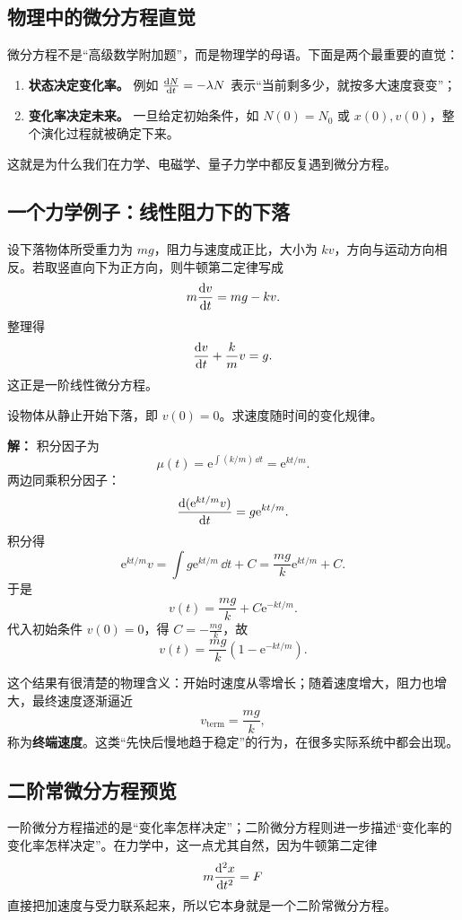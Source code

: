 \subsection{物理中的微分方程直觉}

微分方程不是“高级数学附加题”，而是物理学的母语。下面是两个最重要的直觉：
\begin{enumerate}
  \item \textbf{状态决定变化率。} 例如 $\dv{N}{t}=-\lambda N$ 表示“当前剩多少，就按多大速度衰变”；
  \item \textbf{变化率决定未来。} 一旦给定初始条件，如 $N(0)=N_0$ 或 $x(0),v(0)$，整个演化过程就被确定下来。
\end{enumerate}
这就是为什么我们在力学、电磁学、量子力学中都反复遇到微分方程。

\subsection{一个力学例子：线性阻力下的下落}

设下落物体所受重力为 $mg$，阻力与速度成正比，大小为 $kv$，方向与运动方向相反。若取竖直向下为正方向，则牛顿第二定律写成
\[
  m\dv{v}{t}=mg-kv.
\]
整理得
\[
  \dv{v}{t}+\frac{k}{m}v=g.
\]
这正是一阶线性微分方程。

\begin{example}
设物体从静止开始下落，即 $v(0)=0$。求速度随时间的变化规律。

\textbf{解：} 积分因子为
\[
  \mu(t)=\mathrm{e}^{\int (k/m)\,\dd t}=\mathrm{e}^{kt/m}.
\]
两边同乘积分因子：
\[
  \dv{(\mathrm{e}^{kt/m}v)}{t}=g\mathrm{e}^{kt/m}.
\]
积分得
\[
  \mathrm{e}^{kt/m}v = \int g\mathrm{e}^{kt/m}\,\dd t + C = \frac{mg}{k}\mathrm{e}^{kt/m}+C.
\]
于是
\[
  v(t)=\frac{mg}{k} + C\mathrm{e}^{-kt/m}.
\]
代入初始条件 $v(0)=0$，得 $C=-\frac{mg}{k}$，故
\[
  v(t)=\frac{mg}{k}\left(1-\mathrm{e}^{-kt/m}\right).
\]
\end{example}

这个结果有很清楚的物理含义：开始时速度从零增长；随着速度增大，阻力也增大，最终速度逐渐逼近
\[
  v_{\text{term}} = \frac{mg}{k},
\]
称为\textbf{终端速度}。这类“先快后慢地趋于稳定”的行为，在很多实际系统中都会出现。

\subsection{二阶常微分方程预览}

一阶微分方程描述的是“变化率怎样决定”；二阶微分方程则进一步描述“变化率的变化率怎样决定”。在力学中，这一点尤其自然，因为牛顿第二定律
\[
  m\dv[2]{x}{t}=F
\]
直接把加速度与受力联系起来，所以它本身就是一个二阶常微分方程。


